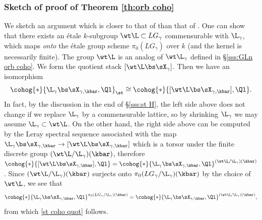 \subsubsection{Sketch of proof of Theorem \ref{th:orb coho}}\label{sss:pf SO} We sketch an argument which is closer to that of \cite{GKM} than that of \cite{NgoFL}. One can show that there exists an \'etale $k$-subgroup $\wt\L\subset LG_{\gamma}$ commensurable with $\L_{\gamma}$, which maps {\em onto} the \'etale group scheme $\pi_{0}(LG_{\gamma})$ over $k$ (and the kernel is necessarily finite). The group $\wt\L$ is an analog of $\wt\L_{\gamma}$ defined in \S\ref{sss:GLn orb coho}. We form the quotient stack $[\wt\L\bs \sX_{\gamma}]$. Then we have an isomorphism
\begin{equation}\label{st coho quot}
\cohog{*}{\L_{\gamma}\bs\sX_{\gamma,\kbar},\Ql}_{\st}\cong \cohog{*}{[\wt\L\bs\sX_{\gamma,\kbar}],\Ql}.
\end{equation}
In fact, by the discussion in the end of \S\ref{sss:st H}, the left side above does not change if we replace $\L_{\gamma}$ by a commensurable lattice, so by shrinking $\L_{\gamma}$ we may assume $\L_{\gamma}\subset \wt\L$. On the other hand, the right side above can be computed by the Leray spectral sequence associated with the map $\L_{\gamma}\bs\sX_{\gamma,\kbar}\to[\wt\L\bs\sX_{\gamma,\kbar}]$ which is a torsor under the finite discrete group $(\wt\L/\L_{\gamma})(\kbar)$, therefore $\cohog{*}{[\wt\L\bs\sX_{\gamma,\kbar}],\Ql}=\cohog{*}{\L_{\gamma}\bs\sX_{\gamma,\kbar},\Ql}^{(\wt\L/\L_{\gamma})(\kbar)}$. Since $(\wt\L/\L_{\gamma})(\kbar)$ surjects onto $\pi_{0}(LG_{\gamma}/\L_{\gamma})(\kbar)$ by the choice of $\wt\L$, we see that
\begin{equation*}
\cohog{*}{\L_{\gamma}\bs\sX_{\gamma,\kbar},\Ql}^{\pi_{0}(LG_{\gamma}/\L_{\gamma})(\kbar)}=\cohog{*}{\L_{\gamma}\bs\sX_{\gamma,\kbar},\Ql}^{(\wt\L/\L_{\gamma})(\kbar)},
\end{equation*}
from which \eqref{st coho quot} follows.

